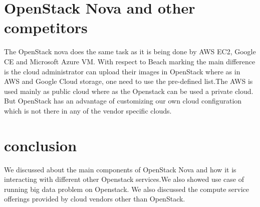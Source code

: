 \documentclass[9pt,twocolumn,twoside]{../../styles/osajnl}
\begin{document}
\section{OpenStack Nova and other competitors}
 The OpenStack nova does the same task as it is being done by AWS EC2, Google CE and Microsoft Azure VM. With respect to Beach marking the main difference is the cloud administrator can upload their images in OpenStack where as in AWS and Google Cloud storage, one need to use the pre-defined list.The AWS is used mainly as public cloud where as the Openstack can be used a private cloud. But OpenStack has an advantage of customizing our own cloud configuration which is not there in any of the vendor specific clouds.


\section{conclusion}

We discussed about the main components of OpenStack Nova and how it is interacting with different other Openstack services.We also showed use case of running big data problem on Openstack. We also discussed the compute service offerings provided by cloud vendors other than OpenStack.


\end{document}
